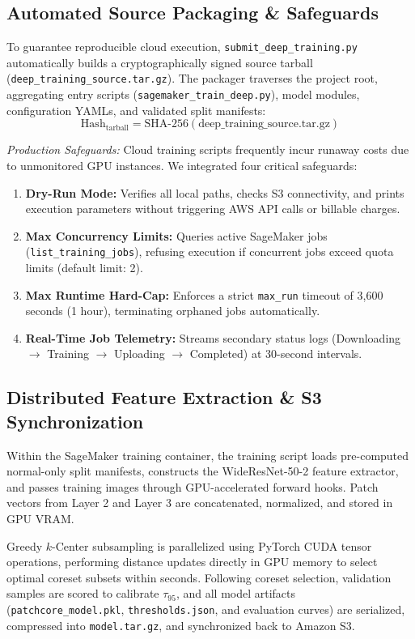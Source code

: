 \documentclass[journal,twocolumn]{IEEEtran}
\begin{document}
\subsection{Automated Source Packaging \& Safeguards}
To guarantee reproducible cloud execution, \texttt{submit\_deep\_training.py} automatically builds a cryptographically signed source tarball (\texttt{deep\_training\_source.tar.gz}). The packager traverses the project root, aggregating entry scripts (\texttt{sagemaker\_train\_deep.py}), model modules, configuration YAMLs, and validated split manifests:
\begin{equation}
\text{Hash}_{\text{tarball}} = \text{SHA-256}\left( \text{deep\_training\_source.tar.gz} \right)
\end{equation}

\textit{Production Safeguards:} Cloud training scripts frequently incur runaway costs due to unmonitored GPU instances. We integrated four critical safeguards:
\begin{enumerate}
    \item \textbf{Dry-Run Mode:} Verifies all local paths, checks S3 connectivity, and prints execution parameters without triggering AWS API calls or billable charges.
    \item \textbf{Max Concurrency Limits:} Queries active SageMaker jobs (\texttt{list\_training\_jobs}), refusing execution if concurrent jobs exceed quota limits (default limit: 2).
    \item \textbf{Max Runtime Hard-Cap:} Enforces a strict \texttt{max\_run} timeout of 3,600 seconds (1 hour), terminating orphaned jobs automatically.
    \item \textbf{Real-Time Job Telemetry:} Streams secondary status logs (Downloading $\rightarrow$ Training $\rightarrow$ Uploading $\rightarrow$ Completed) at 30-second intervals.
\end{enumerate}

\subsection{Distributed Feature Extraction \& S3 Synchronization}
Within the SageMaker training container, the training script loads pre-computed normal-only split manifests, constructs the WideResNet-50-2 feature extractor, and passes training images through GPU-accelerated forward hooks. Patch vectors from Layer 2 and Layer 3 are concatenated, normalized, and stored in GPU VRAM.

Greedy $k$-Center subsampling is parallelized using PyTorch CUDA tensor operations, performing distance updates directly in GPU memory to select optimal coreset subsets within seconds. Following coreset selection, validation samples are scored to calibrate $\tau_{95}$, and all model artifacts (\texttt{patchcore\_model.pkl}, \texttt{thresholds.json}, and evaluation curves) are serialized, compressed into \texttt{model.tar.gz}, and synchronized back to Amazon S3.
\end{document}
